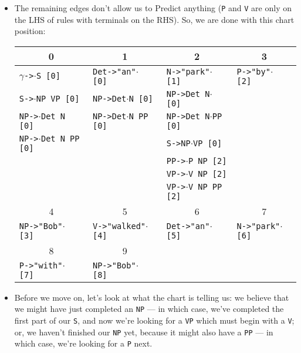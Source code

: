 \documentclass[a4paper]{article}
\begin{document}
\begin{enumerate}
\begin{enumerate}
\begin{enumerate}
\begin{itemize}
\item The remaining edges don't allow us to Predict anything (\texttt{P} and \texttt{V} are only on the LHS of rules with terminals on the RHS). So, we are done with this chart position:
\begin{table}[hp]
\centering
\begin{tabular}{l|l|l|l}
\multicolumn{1}{c}{0} & \multicolumn{1}{c}{1} &\multicolumn{1}{c}{2} & \multicolumn{1}{c}{3} \\
\hline
$\gamma$\texttt{->}$\cdot$\texttt{S [0]} & \texttt{Det->"an"}$\cdot$\texttt{ [0]} & \texttt{N->"park"}$\cdot$\texttt{ [1]} & \texttt{P->"by"}$\cdot$\texttt{ [2]} \\
\texttt{S->}$\cdot$\texttt{NP VP [0]} & \texttt{NP->Det}$\cdot$\texttt{N [0]} & \texttt{NP->Det N}$\cdot$\texttt{ [0]} & \\
\texttt{NP->}$\cdot$\texttt{Det N [0]} & \texttt{NP->Det}$\cdot$\texttt{N PP [0]} & \texttt{NP->Det N}$\cdot$\texttt{PP [0]} & \\
\texttt{NP->}$\cdot$\texttt{Det N PP [0]} & & \texttt{S->NP}$\cdot$\texttt{VP [0]} & \\
 & & \texttt{PP->}$\cdot$\texttt{P NP [2]} & \\
 & & \texttt{VP->}$\cdot$\texttt{V NP [2]} & \\
 & & \texttt{VP->}$\cdot$\texttt{V NP PP [2]} & \\
\hline
\multicolumn{1}{c}{4} & \multicolumn{1}{c}{5} & \multicolumn{1}{c}{6} & \multicolumn{1}{c}{7} \\
\hline
\texttt{NP->"Bob"}$\cdot$\texttt{ [3]} & \texttt{V->"walked"}$\cdot$\texttt{ [4]} & \texttt{Det->"an"}$\cdot$\texttt{ [5]} & \texttt{N->"park"}$\cdot$\texttt{ [6]} \\
\hline
\multicolumn{1}{c}{8} & \multicolumn{1}{c}{9} & \multicolumn{1}{c}{} & \\
\hline
\texttt{P->"with"}$\cdot$\texttt{ [7]} & \texttt{NP->"Bob"}$\cdot$\texttt{ [8]} & & \\
\hline
\end{tabular}
\end{table}
\item Before we move on, let's look at what the chart is telling us: we believe that we might have just completed an \texttt{NP} --- in which case, we've completed the first part of our \texttt{S}, and now we're looking for a \texttt{VP} which must begin with a \texttt{V}; or, we haven't finished our \texttt{NP} yet, because it might also have a \texttt{PP} --- in which case, we're looking for a \texttt{P} next.

\end{itemize}
\end{enumerate}
\end{enumerate}
\end{enumerate}
\end{document}
